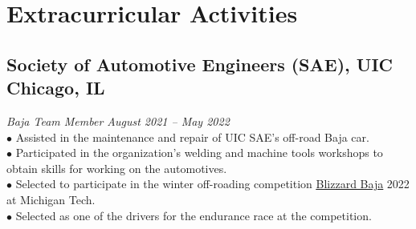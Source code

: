\documentclass{article}
\begin{document}
\section{Extracurricular Activities}
\subsection{Society of Automotive Engineers (SAE), UIC \hfill \textnormal{Chicago, IL}}
\vspace{-0.5em}
\textit{Baja Team Member \hfill August 2021 -- May 2022}
\\
$\bullet$ Assisted in the maintenance and repair of UIC SAE's off-road Baja car.
\\
$\bullet$ Participated in the organization's welding and machine tools workshops to obtain skills for working on the automotives.
\\
$\bullet$ Selected to participate in the winter off-roading competition \href{https://baja.mtu.edu/}{\underline{Blizzard Baja}} 2022 at Michigan Tech.
\\
$\bullet$ Selected as one of the drivers for the endurance race at the competition.
\end{document}
